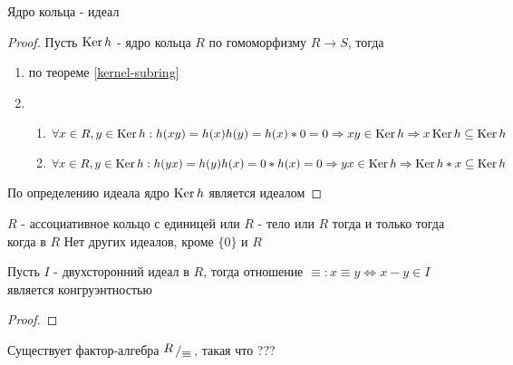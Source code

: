 \documentclass[../main/document.tex]{subfiles}
\begin{document}
\begin{thm}
Ядро кольца - идеал
\begin{proof}
Пусть $\operatorname{Ker} h$ - ядро кольца $R$ по гомоморфизму $R\to S$, тогда
\begin{enumerate}
\item по теореме \ref{kernel-subring}
\item
\begin{enumerate}
\item $\forall x\in R, y\in \operatorname{Ker} h: h(xy)=h(x)h(y)=h(x)*0=0\Rightarrow xy\in \operatorname{Ker} h\Rightarrow x\operatorname{Ker} h\subseteq \operatorname{Ker} h$
\item $\forall x\in R, y\in \operatorname{Ker} h: h(yx)=h(y)h(x)=0*h(x)=0\Rightarrow yx\in \operatorname{Ker} h\Rightarrow \operatorname{Ker} h*x\subseteq \operatorname{Ker} h$
\end{enumerate}

\end{enumerate}
По определению идеала ядро $\operatorname{Ker} h$ является идеалом
\end{proof}
\end{thm}
\begin{exm}

\end{exm}
\begin{thm}
$R$ - ассоциативное кольцо с единицей или $R$ - тело или $R$ тогда и только тогда когда в $R$ Нет других идеалов, кроме $\{0\}$ и $R$
\end{thm}
\begin{dfn}

\end{dfn}
\begin{thm}
Пусть $I$ - двухсторонний идеал в $R$, тогда отношение $\equiv: x\equiv y \Leftrightarrow x-y\in I$ является конгруэнтностью
\begin{proof}

\end{proof}
\end{thm}
\begin{cnsq}
Существует фактор-алгебра $\bigslant{R}{\equiv}$, такая что ???
\end{cnsq}
\end{document}
